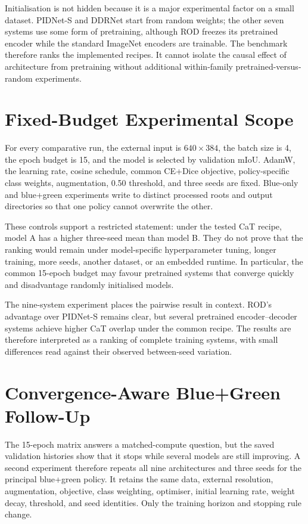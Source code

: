 Initialisation is not hidden because it is a major experimental factor on a
small dataset. PIDNet-S and DDRNet start from random weights; the other seven
systems use some form of pretraining, although ROD freezes its pretrained
encoder while the standard ImageNet encoders are trainable. The benchmark
therefore ranks the implemented recipes. It cannot isolate the causal effect
of architecture from pretraining without additional within-family
pretrained-versus-random experiments.

\section{Fixed-Budget Experimental Scope}

For every comparative run, the external input is $640\times384$, the
batch size is 4, the epoch budget is 15, and the model is selected by validation
mIoU. AdamW, the learning rate, cosine schedule, common CE+Dice objective,
policy-specific class weights, augmentation, 0.50 threshold, and three seeds
are fixed. Blue-only and blue+green experiments write to distinct processed
roots and output directories so that one policy cannot overwrite the other.

These controls support a restricted statement: under the tested CaT recipe,
model A has a higher three-seed mean than model B. They do not prove that the
ranking would remain under model-specific hyperparameter tuning, longer
training, more seeds, another dataset, or an embedded runtime. In particular,
the common 15-epoch budget may favour pretrained systems that converge quickly
and disadvantage randomly initialised models.

The nine-system experiment places the pairwise result in context. ROD's
advantage over PIDNet-S remains clear, but several pretrained
encoder--decoder systems achieve higher CaT overlap under the common recipe.
The results are therefore interpreted as a ranking of complete training
systems, with small differences read against their observed between-seed
variation.

\section{Convergence-Aware Blue+Green Follow-Up}

The 15-epoch matrix answers a matched-compute question, but the saved
validation histories show that it stops while several models are still
improving. A second experiment therefore repeats all nine architectures and
three seeds for the principal blue+green policy. It retains the same data,
external resolution, augmentation, objective, class weighting, optimiser,
initial learning rate, weight decay, threshold, and seed identities. Only the
training horizon and stopping rule change.

